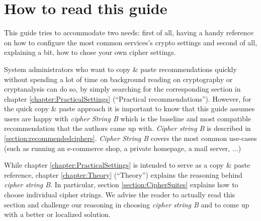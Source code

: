 \section{How to read this guide}

This guide tries to accommodate two needs: first of all, having a handy reference on how to configure the most common services's crypto settings and second of all, explaining a bit, how to chose your own cipher settings.

System administrators who want to copy \& paste recommendations quickly without spending a lot of time on background reading on cryptography or cryptanalysis can do so, by simply searching for the corresponding section in chapter \ref{chapter:PracticalSettings} (``Practical recommendations''). However, for the quick copy \& paste approach it is important to know that this guide assumes users are happy with \textit{cipher String B} which is the baseline and most compatible recommendation that the authors came up with. \textit{Cipher string B} is described in \ref{section:recommendedciphers}. \textit{Cipher String B} covers the most common use-cases (such as running an e-commerce shop, a private homepage, a mail server, $ \ldots $)

While chapter \ref{chapter:PracticalSettings} is intended to serve as a copy \& paste reference, chapter \ref{chapter:Theory} (``Theory'') explains the reasoning behind \textit{cipher string B}. In particular, section \ref{section:CipherSuites} explains how to choose individual cipher strings. We advise the reader to actually read this section and challenge our reasoning in choosing \textit{cipher string B} and to come up with a better  or localized solution.


